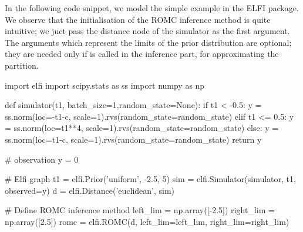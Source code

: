 In the following code snippet, we model the simple example in the ELFI
package. We observe that the initialisation of the ROMC inference
method is quite intuitive; we juct pass the distance node of the
simulator as the first argument. The arguments  which represent the limits of the prior distribution are
optional; they are needed only if  is
called in the inference part, for approximating the partition.

\begin{pythoncode}
  import elfi
  import scipy.stats as ss
  import numpy as np
  
  def simulator(t1, batch_size=1,random_state=None):
      if t1 < -0.5:
          y = ss.norm(loc=-t1-c, scale=1).rvs(random_state=random_state)
      elif t1 <= 0.5:
          y = ss.norm(loc=t1**4, scale=1).rvs(random_state=random_state)
      else:
          y = ss.norm(loc=t1-c, scale=1).rvs(random_state=random_state)
      return y

  # observation
  y = 0
      
  # Elfi graph    
  t1 = elfi.Prior('uniform', -2.5, 5)
  sim = elfi.Simulator(simulator, t1, observed=y)
  d = elfi.Distance('euclidean', sim)

  # Define ROMC inference method
  left_lim = np.array([-2.5])
  right_lim = np.array([2.5])
  romc = elfi.ROMC(d, left_lim=left_lim, right_lim=right_lim)
\end{pythoncode}


